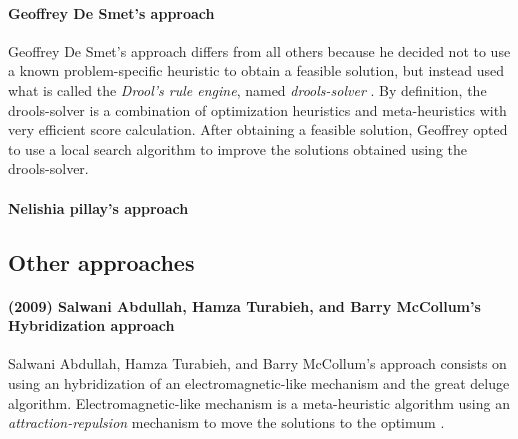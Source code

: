 \paragraph{Geoffrey De Smet's approach}
Geoffrey De Smet's approach \cite{Smet2007} differs from all others because he decided not to use a known problem-specific heuristic to obtain a feasible solution, but instead used what is called the \textit{Drool's rule engine}, named \textit{drools-solver} \cite{Drools}. By definition, the drools-solver is a combination of optimization heuristics and meta-heuristics with very efficient score calculation. After obtaining a feasible solution, Geoffrey opted to use a local search algorithm to improve the solutions obtained using the drools-solver.\\

\paragraph{Nelishia pillay's approach}


\subsection{Other approaches}
\label{subsection:OtherAppr}

\paragraph{(2009) Salwani Abdullah, Hamza Turabieh, and Barry McCollum's Hybridization approach}
Salwani Abdullah, Hamza Turabieh, and Barry McCollum's approach \cite{Abdullah2009} consists on using an hybridization of an electromagnetic-like mechanism and the great deluge algorithm. Electromagnetic-like mechanism is a meta-heuristic algorithm using an \textit{attraction-repulsion} mechanism to move the solutions to the optimum \cite{Javadian2008}.\\
